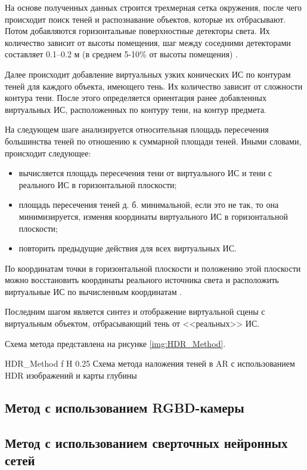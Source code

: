 На основе полученных данных строится трехмерная сетка окружения, после чего происходит поиск теней и распознавание объектов, которые их отбрасывают. Потом добавляются горизонтальные поверхностные детекторы света. Их количество зависит от высоты помещения, шаг между соседними детекторами составляет 0.1–0.2 м (в среднем 5-10\% от высоты помещения) \cite{hdr_method}.

Далее происходит добавление виртуальных узких конических ИС по контурам теней для каждого объекта, имеющего тень. Их количество зависит от сложности контура тени. После этого определяется ориентация ранее добавленных виртуальных ИС,  расположенных по контуру тени, на контур предмета.

На следующем шаге анализируется относительная площадь пересечения большинства теней по отношению к суммарной площади теней. Иными словами, происходит следующее:

\begin{itemize}
	\item вычисляется площадь пересечения тени от виртуального ИС и тени с реального ИС в горизонтальной плоскости;
	\item площадь пересечения теней д. б. минимальной, если это не так, то она минимизируется, изменяя координаты виртуального ИС в горизонтальной плоскости;
	\item повторить предыдущие действия для всех виртуальных ИС.
\end{itemize}

По координатам точки в горизонтальной плоскости и положению этой плоскости можно восстановить координаты реального источника света и расположить виртуальные ИС по вычисленным координатам \cite{hdr_method}.

Последним шагом является синтез и отображение виртуальной сцены с виртуальным объектом, отбрасывающий тень от <<реальных>> ИС.

Схема метода представлена на рисунке \ref{img:HDR_Method}.

	{HDR_Method}
	{f}
	{H}
	{0.25\textwidth}
	{Схема метода наложения теней в AR с использованием HDR изображений и карты глубины}

\subsection{Метод с использованием RGBD-камеры}

\subsection{Метод с использованием сверточных нейронных сетей}

